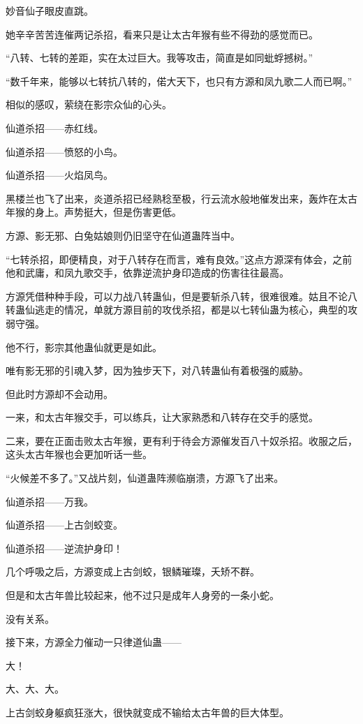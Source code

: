 \begin{this_body}
妙音仙子眼皮直跳。

她辛辛苦苦连催两记杀招，看来只是让太古年猴有些不得劲的感觉而已。

“八转、七转的差距，实在太过巨大。我等攻击，简直是如同蚍蜉撼树。”

“数千年来，能够以七转抗八转的，偌大天下，也只有方源和凤九歌二人而已啊。”

相似的感叹，萦绕在影宗众仙的心头。

仙道杀招——赤红线。

仙道杀招——愤怒的小鸟。

仙道杀招——火焰凤鸟。

黑楼兰也飞了出来，炎道杀招已经熟稔至极，行云流水般地催发出来，轰炸在太古年猴的身上。声势挺大，但是伤害更低。

方源、影无邪、白兔姑娘则仍旧坚守在仙道蛊阵当中。

“七转杀招，即便精良，对于八转存在而言，难有良效。”这点方源深有体会，之前他和武庸，和凤九歌交手，依靠逆流护身印造成的伤害往往最高。

方源凭借种种手段，可以力战八转蛊仙，但是要斩杀八转，很难很难。姑且不论八转蛊仙逃走的情况，单就方源目前的攻伐杀招，都是以七转仙蛊为核心，典型的攻弱守强。

他不行，影宗其他蛊仙就更是如此。

唯有影无邪的引魂入梦，因为独步天下，对八转蛊仙有着极强的威胁。

但此时方源却不会动用。

一来，和太古年猴交手，可以练兵，让大家熟悉和八转存在交手的感觉。

二来，要在正面击败太古年猴，更有利于待会方源催发百八十奴杀招。收服之后，这头太古年猴也会更加听话一些。

“火候差不多了。”又战片刻，仙道蛊阵濒临崩溃，方源飞了出来。

仙道杀招——万我。

仙道杀招——上古剑蛟变。

仙道杀招——逆流护身印！

几个呼吸之后，方源变成上古剑蛟，银鳞璀璨，夭矫不群。

但是和太古年兽比较起来，他不过只是成年人身旁的一条小蛇。

没有关系。

接下来，方源全力催动一只律道仙蛊——

大！

大、大、大。

上古剑蛟身躯疯狂涨大，很快就变成不输给太古年兽的巨大体型。


\end{this_body}
